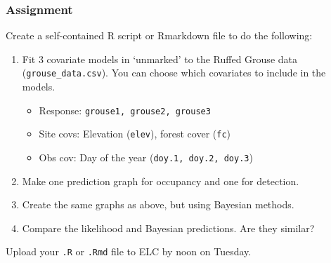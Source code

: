 \documentclass[color=usenames,dvipsnames]{beamer}\usepackage[]{graphicx}\usepackage[]{xcolor}
\begin{document}
\begin{frame}
  \frametitle{Assignment}
  \footnotesize
  Create a self-contained R script or Rmarkdown file
  to do the following:
  \vfill
  \begin{enumerate}
    \footnotesize
    \item Fit 3 covariate models in `unmarked' to the Ruffed Grouse
      data ({\tt grouse\_data.csv}). You can choose which covariates
      to include in the models.  
      \begin{itemize}
        \footnotesize
        \item Response: \texttt{grouse1, grouse2, grouse3}
        \item Site covs: Elevation (\texttt{elev}), forest cover ({\tt fc})
        \item Obs cov: Day of the year (\texttt{doy.1, doy.2, doy.3})
      \end{itemize}
    \item Make one prediction graph for occupancy and one for
      detection.  
    \item Create the same graphs as above, but using Bayesian methods.
    \item Compare the likelihood and Bayesian predictions. Are they
      similar?   
    \end{enumerate}
    \vfill
    Upload your {\tt .R} or {\tt .Rmd} file to ELC by noon on Tuesday. 
\end{frame}
\end{document}

